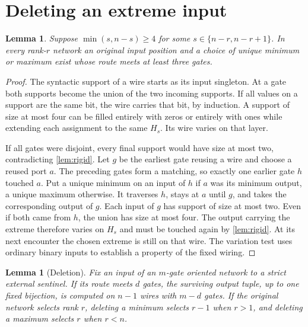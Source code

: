\documentclass[11pt,reqno]{amsart}
\newtheorem{lemma}[theorem]{Lemma}
\begin{document}
\section{Deleting an extreme input}
\begin{lemma}\label{lem:three}
Suppose $\min(s,n-s)\ge4$ for some $s\in\{n-r,n-r+1\}$.
In every rank-$r$ network an original input position and a choice of
unique minimum or maximum exist whose route meets at least three gates.
\end{lemma}
\begin{proof}
The syntactic support of a wire starts as its input singleton. At a gate
both supports become the union of the two incoming supports. If all values
on a support are the same bit, the wire carries that bit, by induction.
A support of size at most four can be filled entirely with zeros or entirely
with ones while extending each assignment to the same $H_s$. Its wire varies
on that layer.

If all gates were disjoint, every final support would have size at most two,
contradicting \cref{lem:rigid}. Let $g$ be the earliest gate reusing a
wire and choose a reused port $a$. The preceding gates form a matching,
so exactly one earlier gate $h$ touched $a$. Put a unique minimum on an
input of $h$ if $a$ was its minimum output, a unique maximum otherwise.
It traverses $h$, stays at $a$ until $g$, and takes the corresponding output
of $g$. Each input of $g$ has support of size at most two. Even if both came
from $h$, the union has size at most four. The output carrying the extreme
therefore varies on $H_s$ and must be touched again by \cref{lem:rigid}.
At its next encounter the chosen extreme is still on that wire. The variation
test uses ordinary binary inputs to establish a property of the fixed wiring.
\end{proof}
\begin{lemma}[Deletion]\label{lem:delete}
Fix an input of an $m$-gate oriented network to a strict external sentinel.
If its route meets $d$ gates, the surviving output tuple, up to one fixed
bijection, is computed on $n-1$ wires with $m-d$ gates. If the original
network selects rank $r$, deleting a minimum selects $r-1$ when $r>1$,
and deleting a maximum selects $r$ when $r<n$.
\end{lemma}
\end{document}
